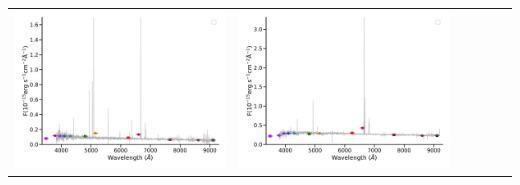 \begin{center}
\begin{longtable}{l l l l l l }
    \includegraphics[width=0.3\linewidth, clip]{Figs/Figs-sdss/spec-0372-52173-0296-SPLUS-s02s04-032140.pdf} & \includegraphics[width=0.3\linewidth, clip]{Figs/Figs-sdss/spec-0373-51788-0507-STRIPE82-0132-025641.pdf} \\
  \end{longtable}
\end{center}
